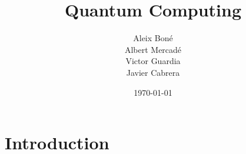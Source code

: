 

\title{
    Quantum Computing
}
\author {
    Aleix Boné\\
    Albert Mercadé\\
    Victor Guardia\\
    Javier Cabrera
}
\date{
    \today
}



\maketitle

\section{Introduction}%
\label{sec:introduction}


